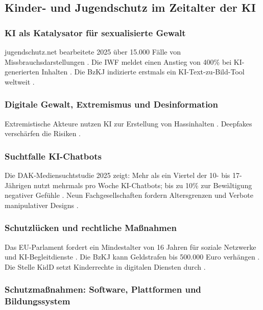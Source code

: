 \documentclass[12pt,a4paper]{article}
\begin{document}
	\subsection{Kinder- und Jugendschutz im Zeitalter der KI}
	
	\subsubsection{KI als Katalysator für sexualisierte Gewalt}
	
	jugendschutz.net bearbeitete 2025 über 15.000 Fälle von Missbrauchsdarstellungen \cite{jugendschutz2025}. Die IWF meldet einen Anstieg von 400\% bei KI-generierten Inhalten \cite{IWF2025}. Die BzKJ indizierte erstmals ein KI-Text-zu-Bild-Tool weltweit \cite{BzKJ2025}.
	
	\subsubsection{Digitale Gewalt, Extremismus und Desinformation}
	
	Extremistische Akteure nutzen KI zur Erstellung von Hassinhalten \cite{jugendschutz2025}. Deepfakes verschärfen die Risiken \cite{BayJumko2025}.
	
	\subsubsection{Suchtfalle KI-Chatbots}
	
	Die DAK-Mediensuchtstudie 2025 zeigt: Mehr als ein Viertel der 10- bis 17-Jährigen nutzt mehrmals pro Woche KI-Chatbots; bis zu 10\% zur Bewältigung negativer Gefühle \cite{DAK2025}. Neun Fachgesellschaften fordern Altersgrenzen und Verbote manipulativer Designs \cite{Fachgesellschaften2025}.
	
	\subsubsection{Schutzlücken und rechtliche Maßnahmen}
	
	Das EU-Parlament fordert ein Mindestalter von 16 Jahren für soziale Netzwerke und KI-Begleitdienste \cite{EUParliament2025}. Die BzKJ kann Geldstrafen bis 500.000 Euro verhängen \cite{BzKJ2025a}. Die Stelle KidD setzt Kinderrechte in digitalen Diensten durch \cite{KidD2025}.
	
	\subsubsection{Schutzmaßnahmen: Software, Plattformen und Bildungssystem}
	
\end{document}
